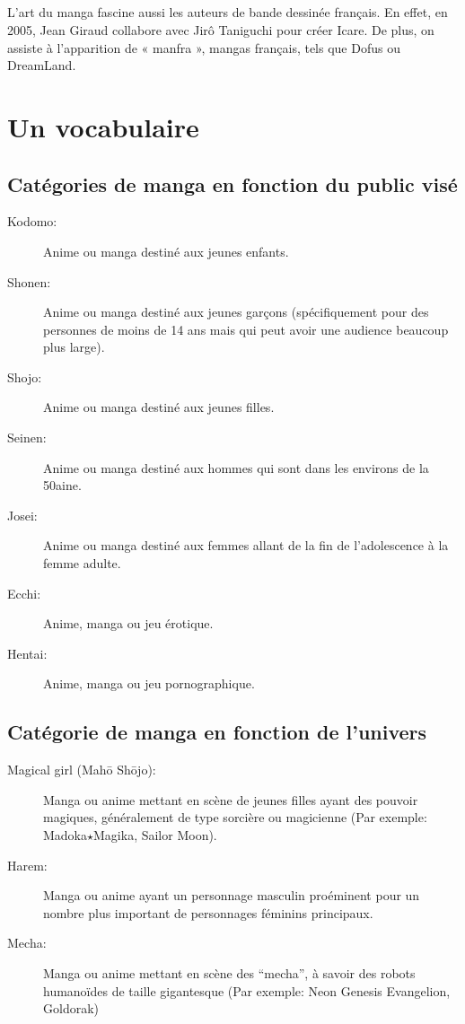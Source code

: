 \paragraph{}
L’art du manga fascine aussi les auteurs de bande dessinée français. En effet, en 2005, Jean Giraud collabore avec Jirô Taniguchi pour créer Icare. De plus, on assiste à l’apparition de « manfra », mangas français, tels que Dofus ou DreamLand.

\chapter{Un vocabulaire}

\section{Catégories de manga en fonction du public visé}

\begin{description}
	\item[Kodomo:] Anime ou manga destiné aux jeunes enfants.
	\item[Shonen:] Anime ou manga destiné aux jeunes garçons (spécifiquement
		pour des personnes de moins de 14 ans mais qui peut avoir une audience
		beaucoup plus large).
	\item[Shojo:] Anime ou manga destiné aux jeunes filles.
	\item[Seinen:] Anime ou manga destiné aux hommes qui sont dans les environs
		de la 50aine.
	\item[Josei:] Anime ou manga destiné aux femmes allant de la fin de
		l'adolescence à la femme adulte.
	\item[Ecchi:] Anime, manga ou jeu érotique.
	\item[Hentai:] Anime, manga ou jeu pornographique.
\end{description}

\section{Catégorie de manga en fonction de l'univers}

\begin{description}
	\item[Magical girl (Mah\=o Sh\=ojo):] Manga ou anime mettant en scène de
		jeunes filles ayant des pouvoir magiques, généralement de type sorcière
		ou magicienne (Par exemple: Madoka$\star$Magika, Sailor Moon).
	\item[Harem:] Manga ou anime ayant un personnage masculin proéminent pour
		un nombre plus important de personnages féminins principaux.
	\item[Mecha:] Manga ou anime mettant en scène des ``mecha'', à savoir des
		robots humanoïdes de taille gigantesque (Par exemple: Neon Genesis
		Evangelion, Goldorak)
\end{description}

